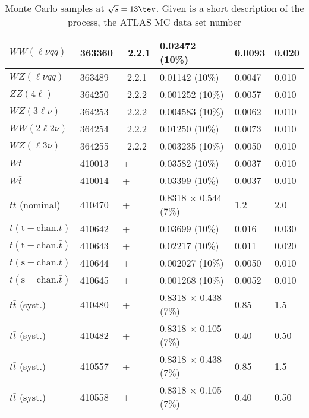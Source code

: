 \begin{table}[htbp]
\begin{center}
\begin{tabular}{l|l|l|l|l|l}
    			$ WW (\ell\nu q\bar{q}) $ & 363360 & \Sherpa\ 2.2.1 & 0.02472 (10\%)  & 0.0093 & 0.020 \\\hline
    			$ WZ (\ell\nu q\bar{q}) $ & 363489 & \Sherpa\ 2.2.1 & 0.01142 (10\%)  & 0.0047 & 0.010 \\\hline
    			$ ZZ (4\ell) $ & 364250 & \Sherpa\ 2.2.2 & 0.001252 (10\%)  & 0.0057 & 0.010 \\\hline
    			$ WZ (3\ell\nu) $ & 364253 & \Sherpa\ 2.2.2 & 0.004583 (10\%)  & 0.0062 & 0.010 \\\hline
    			$ WW (2\ell 2\nu) $ & 364254 & \Sherpa\ 2.2.2 & 0.01250 (10\%)  & 0.0073 & 0.010 \\\hline
    			$ WZ (\ell 3\nu) $ & 364255 & \Sherpa\ 2.2.2 & 0.003235 (10\%)  & 0.0050 & 0.010 \\\hline\hline
    			$ Wt $ & 410013 & \Powheg+\Pythia & 0.03582 (10\%)  & 0.0037 & 0.010 \\\hline
    			$ W\bar{t} $ & 410014 & \Powheg+\Pythia & 0.03399 (10\%)  & 0.0037 & 0.010 \\\hline
    			$ t\bar{t} $ (nominal) & 410470 & \Powheg+\Pythia & 0.8318 $\times$ 0.544 (7\%)  & 1.2 & 2.0 \\\hline
    			$ t (\mathrm{t-chan.} t) $ & 410642 & \Powheg+\Pythia & 0.03699 (10\%)  & 0.016 & 0.030 \\\hline
    			$ t (\mathrm{t-chan.} \bar{t}) $ & 410643 & \Powheg+\Pythia & 0.02217 (10\%)  & 0.011 & 0.020 \\\hline
    			$ t (\mathrm{s-chan.} t) $ & 410644 & \Powheg+\Pythia & 0.002027 (10\%)  & 0.0050 & 0.010 \\\hline
    			$ t (\mathrm{s-chan.} \bar{t}) $ & 410645 & \Powheg+\Pythia & 0.001268 (10\%)  & 0.0052 & 0.010 \\\hline\hline
    			$ t\bar{t} $ (syst.) & 410480 & \Powheg+\Pythia & 0.8318 $\times$ 0.438 (7\%)  & 0.85 & 1.5 \\\hline
    			$ t\bar{t} $ (syst.) & 410482 & \Powheg+\Pythia & 0.8318 $\times$ 0.105 (7\%)  & 0.40 & 0.50 \\\hline
    			$ t\bar{t} $ (syst.) & 410557 & \Powheg+\Pythia & 0.8318 $\times$ 0.438 (7\%)  & 0.85 & 1.5 \\\hline
    			$ t\bar{t} $ (syst.) & 410558 & \Powheg+\Pythia & 0.8318 $\times$ 0.105 (7\%)  & 0.40 & 0.50 \\\hline
    			\hline
    		\end{tabular}
    		\caption{Monte Carlo samples at $\sqrt{s} = 13\tev$. Given is a
    			short description of the process, the ATLAS MC data set number
}
\end{center}
\end{table}
